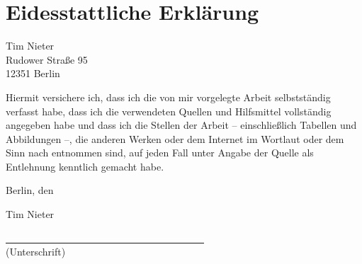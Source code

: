 \chapter*{Eidesstattliche Erklärung}
\label{chapter_erklaerung}
\thispagestyle{empty}

\vfill

Tim Nieter\\
Rudower Straße 95\\
12351 Berlin

\vspace{\baselineskip}

Hiermit versichere ich, dass ich die von mir vorgelegte Arbeit selbstständig verfasst habe, dass ich die verwendeten Quellen und Hilfsmittel
 vollständig angegeben habe und dass ich die Stellen der Arbeit -- einschließlich Tabellen und Abbildungen --, die anderen Werken oder dem Internet im
 Wortlaut oder dem Sinn nach entnommen sind, auf jeden Fall unter Angabe der Quelle als Entlehnung kenntlich gemacht habe.

\vspace{\baselineskip}

Berlin, den {\thesisrelease}

\vspace{1cm}

Tim Nieter

\vspace{.5cm}

\underline{~~~~~~~~~~~~~~~~~~~~~~~~~~~~~~~~~~~~~~~~}\\
(Unterschrift)


%